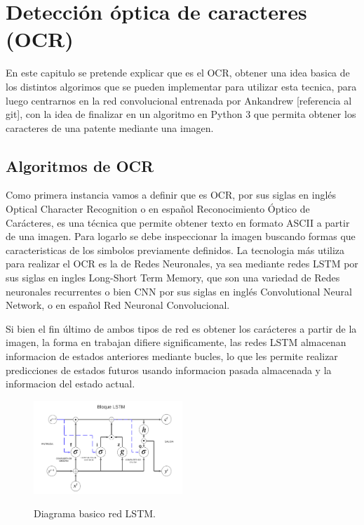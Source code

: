 \chapter{Detección óptica de caracteres (OCR)}
En este capitulo se pretende explicar que es el OCR, obtener una idea basica
de los distintos algorimos que se pueden implementar para
utilizar esta tecnica, para luego centrarnos en la red convolucional entrenada por
Ankandrew [referencia al git], con la idea de finalizar en un algoritmo en Python 3
que permita obtener los caracteres de una patente mediante una imagen.

\section{Algoritmos de OCR}
Como primera instancia vamos a definir que es OCR, por sus siglas en inglés Optical Character
Recognition o en español Reconocimiento Óptico de Carácteres, es una técnica que permite
obtener texto en formato ASCII a partir de una imagen.
Para logarlo se debe inspeccionar la imagen buscando formas que caracteristicas de los simbolos previamente definidos.
La tecnologia más utiliza para realizar el OCR es la de Redes Neuronales, ya sea
mediante redes LSTM por sus siglas en ingles Long-Short Term Memory, que son una variedad de Redes
neuronales recurrentes o bien CNN por sus siglas en inglés Convolutional Neural Network, o en español Red
Neuronal Convolucional.

Si bien el fin último de ambos tipos de red es obtener los carácteres a partir de la imagen, la forma en
trabajan difiere significamente, las redes LSTM almacenan informacion de estados anteriores mediante bucles,
lo que les permite realizar predicciones de estados futuros usando informacion pasada almacenada y la informacion
del estado actual.
\begin{figure}[h]
    \centering
    \includegraphics[width=0.5\textwidth]{imgs/diagrama-lstm.png}
    \label{fig:diagrama-LSTM}
    \caption{Diagrama basico red LSTM.}
\end{figure}

